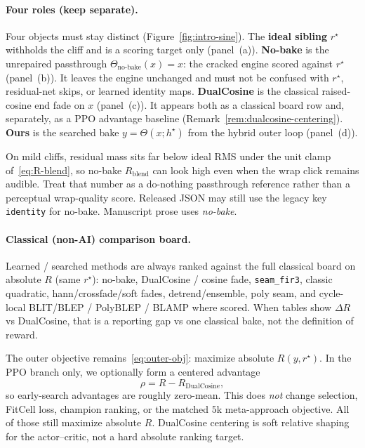 \paragraph{Four roles (keep separate).}
\label{sec:four-roles}
Four objects must stay distinct (Figure~\ref{fig:intro-sine}).
The \textbf{ideal sibling} $r^{\star}$ withholds the cliff and is a scoring target only (panel~(a)).
\textbf{No-bake} is the unrepaired passthrough $\Theta_{\mathrm{no\text{-}bake}}(x)=x$: the cracked engine scored against $r^{\star}$ (panel~(b)).
It leaves the engine unchanged and must not be confused with $r^{\star}$, residual-net skips, or learned identity maps.
\textbf{DualCosine} is the classical raised-cosine end fade on $x$ (panel~(c)).
It appears both as a classical board row and, separately, as a PPO advantage baseline (Remark~\ref{rem:dualcosine-centering}).
\textbf{Ours} is the searched bake $y=\Theta(x;h^{\star})$ from the hybrid outer loop (panel~(d)).

On mild cliffs, residual mass sits far below ideal RMS under the unit clamp of~\eqref{eq:R-blend}, so no-bake $R_{\mathrm{blend}}$ can look high even when the wrap click remains audible.
Treat that number as a do-nothing passthrough reference rather than a perceptual wrap-quality score.
Released JSON may still use the legacy key \texttt{identity} for no-bake.
Manuscript prose uses \emph{no-bake}.

\paragraph{Classical (non-AI) comparison board.}
\label{sec:classical-board}
Learned / searched methods are always ranked against the full classical board on absolute $R$ (same $r^{\star}$):
no-bake, DualCosine / cosine fade, \texttt{seam\_fir3}, classic quadratic, hann/crossfade/soft fades, detrend/ensemble, poly seam, and cycle-local BLIT/BLEP / PolyBLEP / BLAMP where scored.
When tables show $\Delta R$ vs DualCosine, that is a reporting gap vs one classical bake, not the definition of reward.

\begin{remark}
\label{rem:dualcosine-centering}
The outer objective remains~\eqref{eq:outer-obj}: maximize absolute $R(y,r^{\star})$.
In the PPO branch only, we optionally form a centered advantage
\begin{equation}
\label{eq:dualcosine-centering}
\rho = R - R_{\mathrm{DualCosine}},
\end{equation}
so early-search advantages are roughly zero-mean.
This does \emph{not} change selection, FitCell loss, champion ranking, or the matched $5$k meta-approach objective.
All of those still maximize absolute $R$.
DualCosine centering is soft relative shaping for the actor--critic, not a hard absolute ranking target.
\end{remark}

